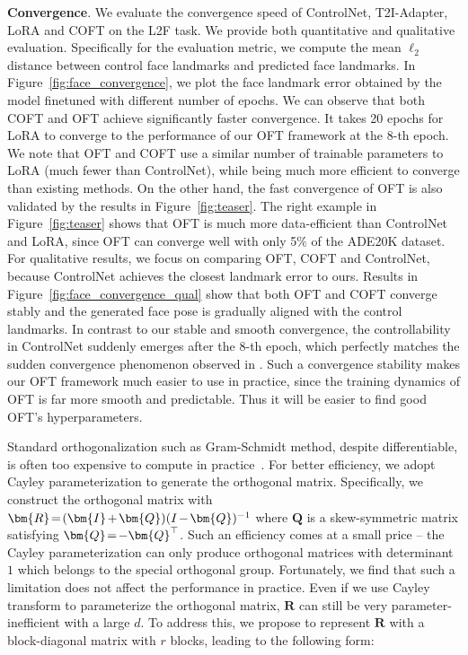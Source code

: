 \begin{itemize}[leftmargin=*,nosep]
\textbf{Convergence}. We evaluate the convergence speed of ControlNet, T2I-Adapter, LoRA and COFT on the L2F task. We provide both quantitative and qualitative evaluation. Specifically for the evaluation metric, we compute the mean $\ell_2$ distance between control face landmarks and predicted face landmarks. In Figure~\ref{fig:face_convergence}, we plot the face landmark error obtained by the model finetuned with different number of epochs. We can observe that both COFT and OFT achieve significantly faster convergence. It takes 20 epochs for LoRA to converge to the performance of our OFT framework at the 8-th epoch. We note that OFT and COFT use a similar number of trainable parameters to LoRA (much fewer than ControlNet), while being much more efficient to converge than existing methods. On the other hand, the fast convergence of OFT is also validated by the results in Figure~\ref{fig:teaser}. The right example in Figure~\ref{fig:teaser} shows that OFT is much more data-efficient than ControlNet and LoRA, since OFT can converge well with only 5\% of the ADE20K dataset. For qualitative results, we focus on comparing OFT, COFT and ControlNet, because ControlNet achieves the closest landmark error to ours. Results in Figure~\ref{fig:face_convergence_qual} show that both OFT and COFT converge stably and the generated face pose is gradually aligned with the control landmarks. In contrast to our stable and smooth convergence, the controllability in ControlNet suddenly emerges after the 8-th epoch, which perfectly matches the sudden convergence phenomenon observed in \cite{zhang2023adding}. Such a convergence stability makes our OFT framework much easier to use in practice, since the training dynamics of OFT is far more smooth and predictable. Thus it will be easier to find good OFT's hyperparameters.

Standard orthogonalization such as Gram-Schmidt method, despite differentiable, is often too expensive to compute in practice~\cite{liu2021orthogonal}. For better efficiency, we adopt Cayley parameterization to generate the orthogonal matrix. Specifically, we construct the orthogonal matrix with $\thickmuskip=2mu \medmuskip=2mu \bm{R}=(\bm{I}+\bm{Q})(I-\bm{Q})^{-1}$ where $\bm{Q}$ is a skew-symmetric matrix satisfying $\thickmuskip=2mu \medmuskip=2mu \bm{Q}=-\bm{Q}^\top$. Such an efficiency comes at a small price -- the Cayley parameterization can only produce orthogonal matrices with determinant $1$ which belongs to the special orthogonal group. Fortunately, we find that such a limitation does not affect the performance in practice. Even if we use Cayley transform to parameterize the orthogonal matrix, $\bm{R}$ can still be very parameter-inefficient with a large $d$. To address this, we propose to represent $\bm{R}$ with a block-diagonal matrix with $r$ blocks, leading to the following form:


\end{itemize}
